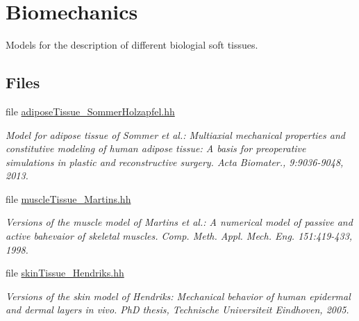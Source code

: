\hypertarget{group__Biomechanics}{\section{Biomechanics}
\label{group__Biomechanics}
}


Models for the description of different biologial soft tissues.  


\subsection*{Files}
\begin{DoxyCompactItemize}
\item 
file \hyperlink{adiposeTissue__SommerHolzapfel_8hh}{adipose\-Tissue\-\_\-\-Sommer\-Holzapfel.\-hh}
\begin{DoxyCompactList}\small\item\em Model for adipose tissue of Sommer et al.\-: Multiaxial mechanical properties and constitutive modeling of human adipose tissue\-: A basis for preoperative simulations in plastic and reconstructive surgery. Acta Biomater., 9\-:9036-\/9048, 2013. \end{DoxyCompactList}\item 
file \hyperlink{muscleTissue__Martins_8hh}{muscle\-Tissue\-\_\-\-Martins.\-hh}
\begin{DoxyCompactList}\small\item\em Versions of the muscle model of Martins et al.\-: A numerical model of passive and active bahevaior of skeletal muscles. Comp. Meth. Appl. Mech. Eng. 151\-:419-\/433, 1998. \end{DoxyCompactList}\item 
file \hyperlink{skinTissue__Hendriks_8hh}{skin\-Tissue\-\_\-\-Hendriks.\-hh}
\begin{DoxyCompactList}\small\item\em Versions of the skin model of Hendriks\-: Mechanical behavior of human epidermal and dermal layers in vivo. Ph\-D thesis, Technische Universiteit Eindhoven, 2005. \end{DoxyCompactList}\end{DoxyCompactItemize}
